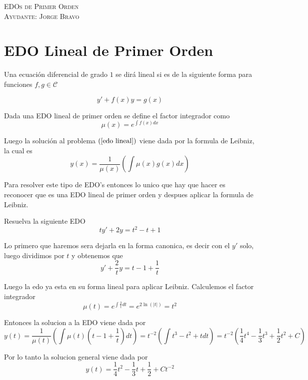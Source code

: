 \documentclass[a4paper,oneside,10.5pt]{article}
\begin{document}
\begin{center}
{\Large \textsc{EDOs de Primer Orden}}\\
\vspace{1em}
\textsc{Ayudante: Jorge Bravo}\\
\end{center}

\section*{EDO Lineal de Primer Orden}
Una ecuación diferencial de grado $1$ se dirá lineal si es de la siguiente forma para funciones $f,g \in \mathcal{C}$

\begin{equation}
  \label{edo lineal}
  y' + f(x)y = g(x)
\end{equation}

Dada una EDO lineal de primer orden se define el factor integrador como
\begin{equation*}
  \mu(x) = e^{\int f(x) dx}
\end{equation*}

Luego la solución al problema $(\ref{edo lineal})$ viene dada por la formula de Leibniz, la cual es
\begin{equation*}
  y(x) = \frac{1}{\mu(x)} (\int \mu(x) g(x) dx)
\end{equation*}

Para resolver este tipo de EDO's entonces lo unico que hay que hacer es reconocer que es una EDO lineal de primer orden y despues aplicar la formula de Leibniz.

\begin{ejemplo}
  Resuelva la siguiente EDO
  \begin{equation*}
    ty' + 2y = t^{2} - t  + 1
  \end{equation*}

  Lo primero que haremos sera dejarla en la forma canonica, es decir con el $y'$ solo, luego dividimos por $t$ y obtenemos que
  \begin{equation*}
    y' + \frac{2}{t}y = t - 1 + \frac{1}{t}
  \end{equation*}

  Luego la edo ya esta en su forma lineal para aplicar Leibniz. Calculemos el factor integrador
  \begin{equation*}
    \mu(t) = e^{\int \frac{2}{t} dt} = e^{2 \ln(|t|)} = t^{2}
  \end{equation*}

  Entonces la solucion a la EDO viene dada por
  \begin{equation*}
    y(t) = \frac{1}{\mu(t)}(\int \mu(t)(t - 1 + \frac{1}{t}) dt) = t^{-2}(\int t^{3} - t^{2} + t dt) = t^{-2}(\frac{1}{4} t^{4} - \frac{1}{3}t^{3} + \frac{1}{2}t^{2} + C)
  \end{equation*}

  Por lo tanto la solucion general viene dada por
  \begin{equation*}
    y(t) = \frac{1}{4}t^{2} - \frac{1}{3}t + \frac{1}{2} + Ct^{-2}
  \end{equation*}


\end{ejemplo}
\end{document}

